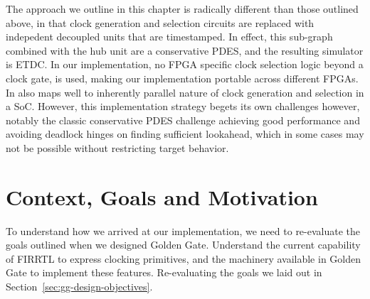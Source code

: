 The approach we outline in this chapter is radically different than those
outlined above, in that clock generation and selection circuits are replaced
with indepedent decoupled units that are timestamped. In effect, this sub-graph
combined with the hub unit are a conservative PDES, and the resulting simulator
is ETDC.  In our implementation, no FPGA specific clock selection logic beyond
a clock gate, is used, making our implementation portable across different
FPGAs. In also maps well to inherently parallel nature of clock generation and
selection in a SoC. However, this implementation strategy begets its own
challenges however, notably the classic conservative PDES challenge achieving
good performance and avoiding deadlock hinges on finding sufficient lookahead,
which in some cases may not be possible without restricting target behavior.

\section{Context, Goals and Motivation}

To understand how we arrived at our implementation, we need to re-evaluate the
goals outlined when we designed Golden Gate. Understand the current capability
of FIRRTL to express clocking primitives, and the machinery available in Golden
Gate to implement these features. Re-evaluating the goals we laid out in
Section~\ref{sec:gg-design-objectives}.

